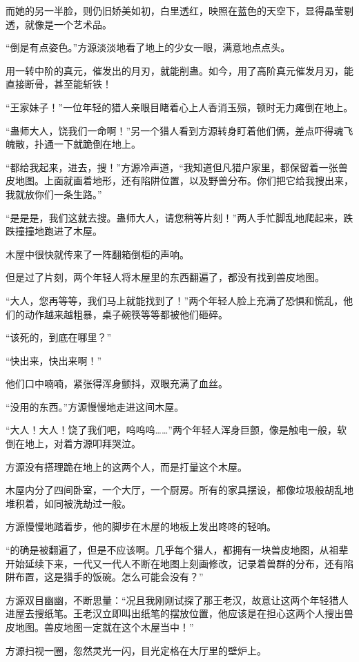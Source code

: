 \begin{this_body}
而她的另一半脸，则仍旧娇美如初，白里透红，映照在蓝色的天空下，显得晶莹剔透，就像是一个艺术品。

“倒是有点姿色。”方源淡淡地看了地上的少女一眼，满意地点点头。

用一转中阶的真元，催发出的月刃，就能削蛊。如今，用了高阶真元催发月刃，能直接断骨，甚至能斩铁！

“王家妹子！”一位年轻的猎人亲眼目睹着心上人香消玉殒，顿时无力瘫倒在地上。

“蛊师大人，饶我们一命啊！”另一个猎人看到方源转身盯着他们俩，差点吓得魂飞魄散，扑通一下就跪倒在地上。

“都给我起来，进去，搜！”方源冷声道，“我知道但凡猎户家里，都保留着一张兽皮地图。上面就画着地形，还有陷阱位置，以及野兽分布。你们把它给我搜出来，我就放你们一条生路。”

“是是是，我们这就去搜。蛊师大人，请您稍等片刻！”两人手忙脚乱地爬起来，跌跌撞撞地跑进了木屋。

木屋中很快就传来了一阵翻箱倒柜的声响。

但是过了片刻，两个年轻人将木屋里的东西翻遍了，都没有找到兽皮地图。

“大人，您再等等，我们马上就能找到了！”两个年轻人脸上充满了恐惧和慌乱，他们的动作越来越粗暴，桌子碗筷等等都被他们砸碎。

“该死的，到底在哪里？”

“快出来，快出来啊！”

他们口中喃喃，紧张得浑身颤抖，双眼充满了血丝。

“没用的东西。”方源慢慢地走进这间木屋。

“大人！大人！饶了我们吧，呜呜呜……”两个年轻人浑身巨颤，像是触电一般，软倒在地上，对着方源叩拜哭泣。

方源没有搭理跪在地上的这两个人，而是打量这个木屋。

木屋内分了四间卧室，一个大厅，一个厨房。所有的家具摆设，都像垃圾般胡乱地堆积着，如同被洗劫过一般。

方源慢慢地踏着步，他的脚步在木屋的地板上发出咚咚的轻响。

“的确是被翻遍了，但是不应该啊。几乎每个猎人，都拥有一块兽皮地图，从祖辈开始延续下来，一代又一代人不断在地图上刻画修改，记录着兽群的分布，还有陷阱布置，这是猎手的饭碗。怎么可能会没有？”

方源双目幽幽，不断思量：“况且我刚刚试探了那王老汉，故意让这两个年轻猎人进屋去搜纸笔。王老汉立即叫出纸笔的摆放位置，他应该是在担心这两个人搜出兽皮地图。兽皮地图一定就在这个木屋当中！”

方源扫视一圈，忽然灵光一闪，目光定格在大厅里的壁炉上。


\end{this_body}
